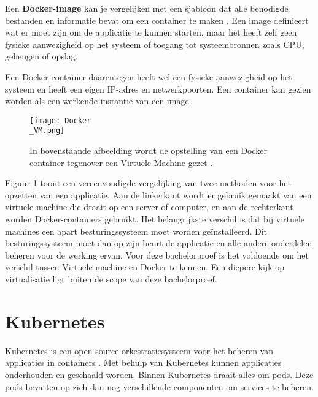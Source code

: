 Een \textbf{Docker-image} kan je vergelijken met een sjabloon dat alle benodigde bestanden en informatie bevat om een container te maken \autocite{Huang2018}. Een image definieert wat er moet zijn om de applicatie te kunnen starten, maar het heeft zelf geen fysieke aanwezigheid op het systeem of toegang tot systeembronnen zoals CPU, geheugen of opslag.

Een Docker-container daarentegen heeft wel een fysieke aanwezigheid op het systeem en heeft een eigen IP-adres en netwerkpoorten. Een container kan gezien worden als een werkende instantie van een image.

\begin{figure}[H]
	\centering
	\texttt{[image: Docker\\\_VM.png]}
	\caption[Voorstelling van Docker tegenover een Virtuele Machine]{\label{fig:Docker vs VM}In bovenstaande afbeelding wordt de opstelling van een Docker container tegenover een Virtuele Machine gezet \autocite{Kim2022}.}
\end{figure}

Figuur \ref{fig:Docker vs VM} toont een vereenvoudigde vergelijking van twee methoden voor het opzetten van een applicatie. Aan de linkerkant wordt er gebruik gemaakt van een virtuele machine die draait op een server of computer, en aan de rechterkant worden Docker-containers gebruikt. Het belangrijkste verschil is dat bij virtuele machines een apart besturingssysteem moet worden geïnstalleerd. Dit besturingssysteem moet dan op zijn beurt de applicatie en alle andere onderdelen beheren voor de werking ervan. Voor deze bachelorproef is het voldoende om het verschil tussen Virtuele machine en Docker te kennen. Een diepere kijk op virtualisatie ligt buiten de scope van deze bachelorproef.

\section{Kubernetes}

Kubernetes is een open-source orkestratiesysteem voor het beheren van applicaties in containers \autocite{Turin2023}. Met behulp van Kubernetes kunnen applicaties onderhouden en geschaald worden. Binnen Kubernetes draait alles om pods. Deze pods bevatten op zich dan nog verschillende componenten om services te beheren. 

